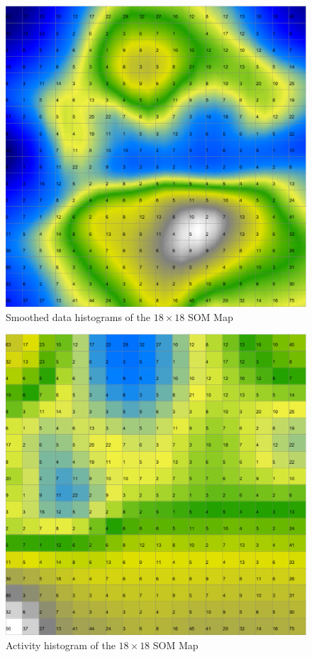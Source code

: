 \documentclass{acm_proc_article-sp}
\begin{document}
\begin{figure}
\centering
\includegraphics[width=\linewidth]{img/wine-mid-smoothed-data-histogram}
\caption{Smoothed data histograms of the $18\times18$ SOM Map}
\label{fig:wine-mid-smoothed-data-histogram}
\end{figure}

\begin{figure}
\centering
\includegraphics[width=\linewidth]{img/wine-mid-activity-histogram}
\caption{Activity histogram of the $18\times18$ SOM Map}
\label{fig:wine-mid-activity-histogram}
\end{figure}
\end{document}
